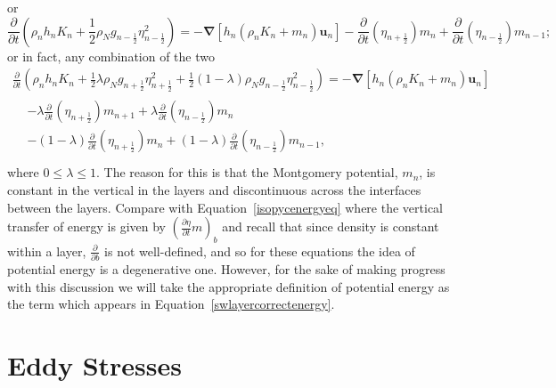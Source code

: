 \documentclass[12pt,a4paper]{report}
\newcommand*\equref[1]{Equation~\eqref{#1}}
\newcommand*{\half}{\frac{1}{2}}
\begin{document}
    or
    \begin{equation}
    \frac{\partial}{\partial t}\left(\rho_{n}h_{n} K_{n}+ 
    \half \rho_{N} g_{n-\half }\eta_{n-\half }^{2} \right) 
    = -\boldsymbol{\nabla} \left[h_{n} \left(\rho_{n}K_{n}+m_{n}\right) \boldsymbol{u}_{n}\right] 
    - \frac{\partial}{\partial t}\left(\eta_{n+\half }\right)   m_{n}
    + \frac{\partial}{\partial t}\left(\eta_{n-\half }\right) m_{n-1};
    \end{equation}
    or in fact, any combination of the two
    \begin{equation}
    \begin{split}
    \frac{\partial}{\partial t}\left(\rho_{n}h_{n} K_{n}+ 
    \half \lambda\rho_{N} g_{n+\half }\eta_{n+\half }^{2}  +
    \half \left(1-\lambda\right)\rho_{N} g_{n-\half }\eta_{n-\half }^{2} \right) 
    = -\boldsymbol{\nabla} \left[h_{n} \left(\rho_{n}K_{n}+m_{n}\right) \boldsymbol{u}_{n}\right] \\
    \begin{split}
    &- \lambda\frac{\partial}{\partial t}\left(\eta_{n+\half }\right)   m_{n+1}
    + \lambda\frac{\partial}{\partial t}\left(\eta_{n-\half }\right) m_{n} \\
    &- \left(1-\lambda\right)\frac{\partial}{\partial t}\left(\eta_{n+\half }\right)   m_{n}
    + \left(1-\lambda\right)\frac{\partial}{\partial t}\left(\eta_{n-\half }\right) m_{n-1}, \\
    \end{split}
    \end{split}
    \end{equation}
    where $0 \leq \lambda \leq 1$. The reason for this is that the Montgomery potential,
    $m_{n}$, is constant in the vertical in the layers and discontinuous across the interfaces between the layers. Compare with \equref{isopycenergyeq} where the 
    vertical transfer of energy is given by 
    $\left(\frac{\partial \eta}{\partial t} m \right)_{b}$ and recall that since density is
     constant within a layer, $\frac{\partial }{\partial b}$ is not well-defined, and so for
      these equations the idea of potential energy is a degenerative one. However,
      for the sake of making progress with this discussion we will take the
      appropriate definition of potential energy as the term which appears in \equref{swlayercorrectenergy}.
    
    
    \section{Eddy Stresses}
    
\end{document}
